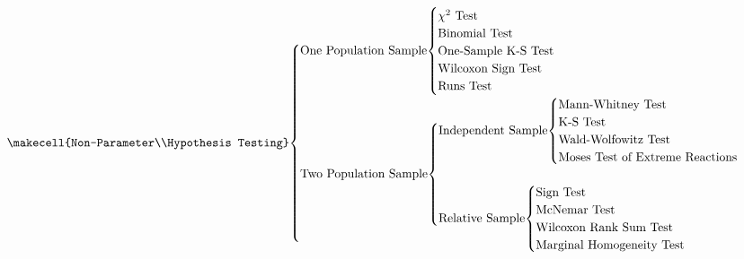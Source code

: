 \[
    \text{\makecell{Non-Parameter\\Hypothesis Testing}}
    \smash[htbp]{
    \begin{cases}
        \text{One Population Sample}
            \smash[t]{
                \begin{cases}
                    \chi^2\text{ Test}\\
                    \text{Binomial Test}\\
                    \text{One-Sample K-S Test}\\
                    \text{Wilcoxon Sign Test}\\
                    \text{Runs Test}
                \end{cases}
            }\\
            \\
            \\
            \\
            \\
        \text{Two Population Sample}
            \smash[t]{
                \begin{cases}
                    \text{Independent Sample}
                    \smash[t]{
                        \begin{cases}
                            \text{Mann-Whitney Test}\\
                            \text{K-S Test}\\
                            \text{Wald-Wolfowitz Test}\\
                            \text{Moses Test of Extreme Reactions}
                        \end{cases}
                    }\\
                    \\
                    \text{Relative Sample}
                    \smash[b]{
                        \begin{cases}
                            \text{Sign Test}\\
                            \text{McNemar Test}\\
                            \text{Wilcoxon Rank Sum Test}\\
                            \text{Marginal Homogeneity Test}
                        \end{cases}
                    }
                \end{cases}
            }\\
            \\

\end{cases}}\]
